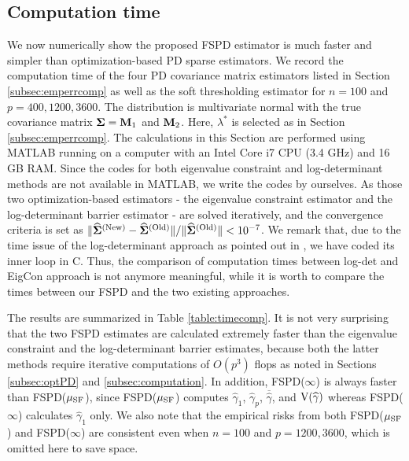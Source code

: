 \documentclass[times,sort&compress,3p]{elsarticle}
\begin{document}
\subsection{Computation time}\label{subsec:timecomp}


We now numerically show the proposed FSPD estimator is much faster and simpler than optimization-based 
PD sparse estimators. We record the computation time of the four PD covariance matrix estimators  listed 
in Section \ref{subsec:emperrcomp} as well as the soft thresholding estimator for $n=100$ and $p=400,1200,3600$.
The distribution is multivariate normal with the true covariance matrix
${\bf \Sigma}={\bf M}_1$ and ${\bf M}_2$. Here, $\lambda^*$ is selected as in
Section \ref{subsec:emperrcomp}. The calculations in this Section are performed using \textsf{MATLAB} running
on a computer with an Intel Core i7 CPU (3.4 GHz) and 16 GB RAM. Since the codes for both eigenvalue constraint and log-determinant methods are not available in \textsf{MATLAB}, we write the codes by ourselves.
As those two optimization-based estimators - the eigenvalue
 constraint estimator and the log-determinant barrier estimator - are solved iteratively, and the convergence criteria is set as
  $\|\widehat{\bf \Sigma}^{\rm (New)} - \widehat{\bf \Sigma}^{\rm (Old)}\| / \|\widehat{\bf\Sigma}^{\rm (Old)}\| < 10^{-7}$. 
 We remark that, 
due to the time issue of the log-determinant approach as pointed out in \citet{Xue2012}, we have coded its inner loop in C.  Thus, the comparison  of computation times 
between log-det and EigCon approach is not anymore meaningful, 
while it is worth to compare the times between our FSPD and the two existing approaches.




The results are summarized in Table \ref{table:timecomp}. It is not very surprising that the two FSPD estimates are
calculated extremely faster than the eigenvalue constraint and the log-determinant barrier estimates, because
 both the latter methods require iterative computations of $O(p^3)$ flops as noted in Sections \ref{subsec:optPD}
 and \ref{subsec:computation}.
In addition, FSPD($\infty$) is always faster than FSPD($\mu_{\rm SF}$), since
FSPD($\mu_{\rm SF}$) computes $\widehat{\gamma}_{1}$, $\widehat{\gamma}_{p}$, $\overline{\widehat{\gamma}}$,
 and ${\rm V}(\widehat{\gamma})$ whereas FSPD($\infty$) calculates $\widehat{\gamma}_{1}$ only.
We also note that the empirical risks from both FSPD($\mu_{\rm SF}$) and FSPD($\infty$) are
 consistent even when $n=100$ and $p=1200,3600$, which is omitted here to save space.
\end{document}

